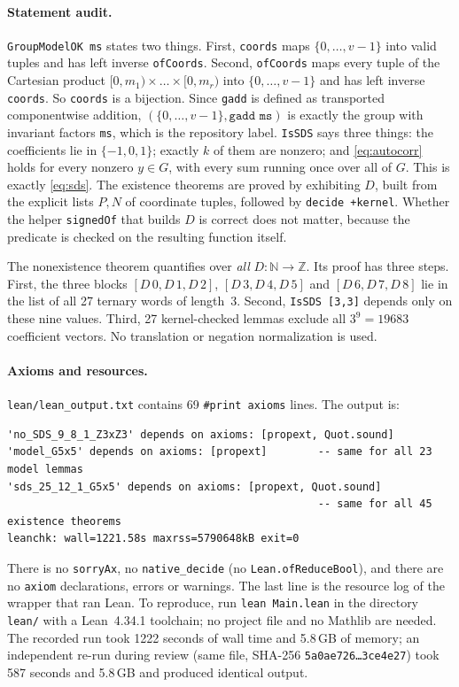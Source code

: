 \documentclass[11pt]{article}
\numberwithin{equation}{section}
\theoremstyle{definition}
\theoremstyle{remark}
\newcommand{\Z}{\mathbb Z}
\begin{document}
\paragraph{Statement audit.}
\texttt{GroupModelOK ms} states two things. First, \texttt{coords} maps $\{0,\dots,v-1\}$ into
valid tuples and has left inverse \texttt{ofCoords}. Second, \texttt{ofCoords} maps every tuple
of the Cartesian product $[0,m_1)\times\dots\times[0,m_r)$ into $\{0,\dots,v-1\}$ and has left
inverse \texttt{coords}. So \texttt{coords} is a bijection. Since \texttt{gadd} is defined as
transported componentwise addition, $(\{0,\dots,v-1\},\texttt{gadd ms})$ is exactly the group
with invariant factors \texttt{ms}, which is the repository label. \texttt{IsSDS} says three
things: the coefficients lie in $\{-1,0,1\}$; exactly $k$ of them are nonzero; and
\eqref{eq:autocorr} holds for every nonzero $y\in G$, with every sum running once over all of
$G$. This is exactly \eqref{eq:sds}. The existence theorems are proved by exhibiting $D$, built
from the explicit lists $P,N$ of coordinate tuples, followed by \texttt{decide +kernel}. Whether
the helper \texttt{signedOf} that builds $D$ is correct does not matter, because the predicate
is checked on the resulting function itself.

The nonexistence theorem quantifies over \emph{all} $D:\mathbb N\to\Z$. Its proof has three
steps. First, the three blocks $[D\,0,D\,1,D\,2]$, $[D\,3,D\,4,D\,5]$ and $[D\,6,D\,7,D\,8]$ lie in
the list of all 27 ternary words of length~3. Second, \texttt{IsSDS [3,3]} depends only on these
nine values. Third, 27 kernel-checked lemmas exclude all $3^9=19683$ coefficient vectors. No
translation or negation normalization is used.

\paragraph{Axioms and resources.} \texttt{lean/lean\_output.txt} contains 69 \texttt{\#print axioms}
lines. The output is:
\begin{lstlisting}
'no_SDS_9_8_1_Z3xZ3' depends on axioms: [propext, Quot.sound]
'model_G5x5' depends on axioms: [propext]        -- same for all 23 model lemmas
'sds_25_12_1_G5x5' depends on axioms: [propext, Quot.sound]
                                                 -- same for all 45 existence theorems
leanchk: wall=1221.58s maxrss=5790648kB exit=0
\end{lstlisting}
There is no \texttt{sorryAx}, no \texttt{native\_decide} (no \texttt{Lean.ofReduceBool}), and
there are no \texttt{axiom} declarations, errors or warnings. The last line is the resource log
of the wrapper that ran Lean. To reproduce, run \texttt{lean Main.lean} in the directory
\texttt{lean/} with a Lean~4.34.1 toolchain; no project file and no Mathlib are needed. The
recorded run took 1222 seconds of wall time and 5.8\,GB of memory; an independent re-run during
review (same file, SHA-256
\texttt{5a0ae726\dots3ce4e27}) took 587 seconds and 5.8\,GB and produced identical output.
\end{document}
